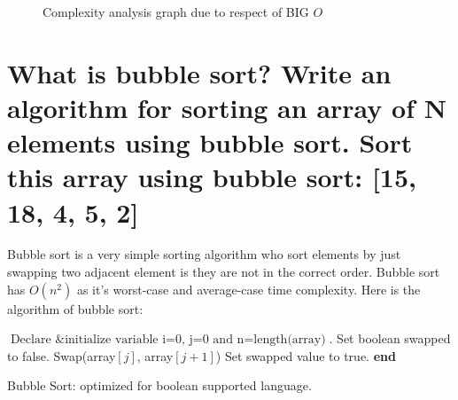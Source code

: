 \documentclass[11 pt]{article}
\begin{document}
	\begin{figure}[h!]
	\centering
	\caption{Complexity analysis graph due to respect of BIG $O$}
	\end{figure}

\pagebreak

\section{What is bubble sort? Write an algorithm for sorting an array of N elements using bubble sort. Sort this array using bubble sort: [15, 18, 4, 5, 2]}
\justify
{
 Bubble sort is a very simple sorting algorithm who sort elements by just swapping two adjacent element is they are not in the correct order. Bubble sort has $O(n^2)$ as it's worst-case and average-case time complexity. Here is the algorithm of bubble sort:
}
\begin{algorithm}
\DontPrintSemicolon
{}
\Begin
{
$\textrm{Declare \& initialize variable i=0, j=0 and n}=\textrm{length(array)}$.\;
Set boolean swapped to false.\;
{
	{
		{
			Swap(array$[j]$, array$[j+1]$)\;
			Set swapped value to true.
		}
	}
}
}
\textbf{end}
\caption{Bubble Sort: optimized for boolean supported language.}
\end{algorithm}
\end{document}

